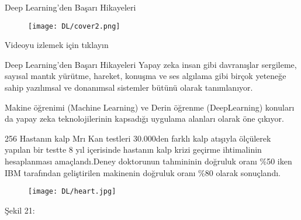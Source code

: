\documentclass{beamer}                                                                                          %
\begin{document}
    
    \begin{frame}{Deep Learning'den Başarı Hikayeleri}
	    \begin{center}
            \begin{figure}
                \vspace*{-7mm}
                \hspace*{-6}
                \texttt{[image: DL/cover2.png]}
            \end{figure}
        \end{center}
        \newline
        \centering
        Videoyu izlemek için tıklayın\par \vspace{20}
        \href{https://photos.google.com/share/AF1QipPjSOZdWI1ZCaZZb0FIiywrNDLHBvZarb5pYxNbw6pUtfWngbplQTaDryMAbwRMfw/photo/AF1QipMp-SkwjbHLZgO74DZHOYvLlA_3r6JwRflnBtRb?key=SUZNRmtwaE00d2ttTnY5QTRXLVJIc041M0RmU0tn}{\huge {}}    
    \end{frame}
    
    
    \begin{frame}{Deep Learning'den Başarı Hikayeleri}
	        \justifying
	        \color{myred1} \color{black}Yapay zeka insan gibi davranışlar sergileme, sayısal mantık yürütme, hareket, konuşma ve ses algılama gibi birçok yeteneğe sahip yazılımsal ve donanımsal sistemler bütünü olarak tanımlanıyor.\par \vspace{25}
            \color{myred1} \color{black}Makine öğrenimi (Machine Learning) ve Derin öğrenme (DeepLearning) konuları da yapay zeka teknolojilerinin kapsadığı uygulama alanları olarak öne çıkıyor.
    \end{frame}
    
    
    \begin{frame}
            \justifying
            \color{myred1} \color{black}256 Hastanın kalp Mrı Kan testleri 30.000den farklı kalp atışıyla ölçülerek yapılan bir testte 8 yıl içerisinde hastanın kalp krizi geçirme ihtimalinin  hesaplanması amaçlandı.Deney doktorunun tahmininin doğruluk oranı \%50 iken IBM tarafından geliştirilen makinenin doğruluk oranı \%80 olarak sonuçlandı.\par \vspace{25}
            \begin{figure}[!tbp]
                \hspace{-10}
                \begin{minipage}[b]{0.60\textwidth}
                    \texttt{[image: DL/heart.jpg]}
                \end{minipage}
            \end{figure}
            \centering
            \color{myred1}Şekil 21:\color{black}
    \end{frame}
    
\end{document}
